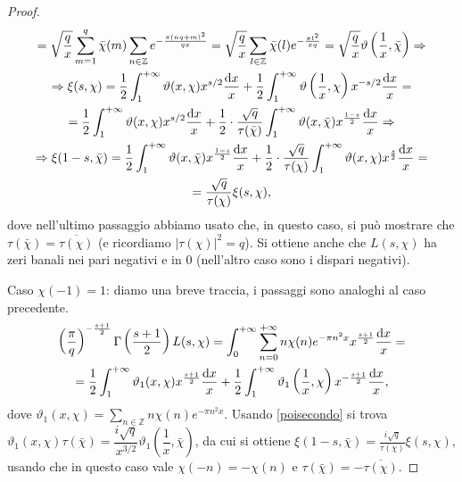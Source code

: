 \begin{proof}
\begin{gather*}
    =\sqrt{\frac{q}{x}}\sum_{m=1}^q \bar{\chi}(m) \sum_{n \in \mathbb{Z}} e^{-\frac{\pi(nq+m)^2}{qx}}=\sqrt{\frac{q}{x}} \sum_{l \in \mathbb{Z}} \bar{\chi}(l)e^{-\frac{\pi l^2}{xq}}=\sqrt{\frac{q}{x}}\vartheta\left(\frac{1}{x},\bar{\chi}\right) \Rightarrow \\
    \Rightarrow \xi(s,\chi)=\frac{1}{2}\int_1^{+\infty} \vartheta(x,\chi)x^{s/2}\frac{\mathop{}\!\mathrm{d} x}{x}+\frac{1}{2}\int_1^{+\infty} \vartheta\left(\frac{1}{x},\chi\right)x^{-s/2}\frac{\mathop{}\!\mathrm{d} x}{x}= \\
    =\frac{1}{2}\int_1^{+\infty} \vartheta(x,\chi)x^{s/2}\frac{\mathop{}\!\mathrm{d} x}{x}+\frac{1}{2}\cdot\frac{\sqrt{q}}{\tau(\bar{\chi})}\int_1^{+\infty} \vartheta(x,\bar{\chi})x^{\frac{1-s}{2}}\frac{\mathop{}\!\mathrm{d} x}{x} \Rightarrow \\
    \Rightarrow \xi(1-s,\bar{\chi})=\frac{1}{2}\int_1^{+\infty} \vartheta(x,\bar{\chi})x^{\frac{1-s}{2}}\frac{\mathop{}\!\mathrm{d} x}{x}+\frac{1}{2}\cdot\frac{\sqrt{q}}{\tau(\chi)}\int_1^{+\infty} \vartheta(x,\chi)x^{\frac{s}{2}}\frac{\mathop{}\!\mathrm{d} x}{x}= \\
    =\frac{\sqrt{q}}{\tau(\chi)}\xi(s,\chi),
  \end{gather*}
  dove nell'ultimo passaggio abbiamo usato che, in questo caso, si può mostrare che $\tau(\bar{\chi})=\overline{\tau(\chi)}$ (e ricordiamo $|\tau(\chi)|^2=q$). Si ottiene anche che $L(s,\chi)$ ha zeri banali nei pari negativi e in $0$ (nell'altro caso sono i dispari negativi).

  Caso $\chi(-1)=1$: diamo una breve traccia, i passaggi sono analoghi al caso precedente.
  \begin{gather*}
    \left(\frac{\pi}{q}\right)^{-\frac{s+1}{2}}\Gamma\left(\frac{s+1}{2}\right)L(s,\chi)=\int_0^{+\infty}\sum_{n=0}^{+\infty} n\chi(n)e^{-\pi n^2x}x^{\frac{s+1}{2}}\frac{\mathop{}\!\mathrm{d} x}{x}= \\
    =\frac{1}{2}\int_1^{+\infty}\vartheta_1(x,\chi)x^{\frac{s+1}{2}}\frac{\mathop{}\!\mathrm{d} x}{x}+\frac{1}{2}\int_1^{+\infty} \vartheta_1\left(\frac{1}{x},\chi\right)x^{-\frac{s+1}{2}}\frac{\mathop{}\!\mathrm{d} x}{x},
  \end{gather*}
  dove $\displaystyle \vartheta_1(x,\chi)=\sum_{n \in \mathbb{Z}} n\chi(n)e^{-\pi n^2x}$. Usando \eqref{poisecondo} si trova $\vartheta_1(x,\chi)\tau(\bar{\chi})=\dfrac{i\sqrt{q}}{x^{3/2}}\vartheta_1\left(\dfrac{1}{x},\bar{\chi}\right)$,
  da cui si ottiene $\xi(1-s,\bar{\chi})=\frac{i\sqrt{q}}{\tau(\chi)}\xi(s,\chi)$, usando che in questo caso vale $\chi(-n)=-\chi(n)$ e $\tau(\bar{\chi})=-\overline{\tau(\chi)}$.
\end{proof}

